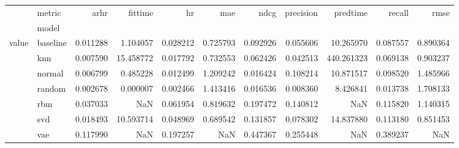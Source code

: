 \begin{tabular}{llrrrrrrrrr}
\toprule
      & metric &      arhr &    fittime &        hr &       mae &      ndcg &  precision &    predtime &    recall &      rmse \\
{} & model &           &            &           &           &           &            &             &           &           \\
\midrule
value & baseline &  0.011288 &   1.104057 &  0.028212 &  0.725793 &  0.092926 &   0.055606 &   10.265970 &  0.087557 &  0.890364 \\
      & knn &  0.007590 &  15.458772 &  0.017792 &  0.732553 &  0.062426 &   0.042513 &  440.261323 &  0.069138 &  0.903237 \\
      & normal &  0.006799 &   0.485228 &  0.012499 &  1.209242 &  0.016424 &   0.108214 &   10.871517 &  0.098520 &  1.485966 \\
      & random &  0.002678 &   0.000007 &  0.002466 &  1.413416 &  0.016536 &   0.008360 &    8.426841 &  0.013738 &  1.708133 \\
      & rbm &  0.037033 &        NaN &  0.061954 &  0.819632 &  0.197472 &   0.140812 &         NaN &  0.115820 &  1.140315 \\
      & svd &  0.018493 &  10.593714 &  0.048969 &  0.689542 &  0.131857 &   0.078302 &   14.837880 &  0.113180 &  0.851453 \\
      & vae &  0.117990 &        NaN &  0.197257 &       NaN &  0.447367 &   0.255448 &         NaN &  0.389237 &       NaN \\
\bottomrule
\end{tabular}
